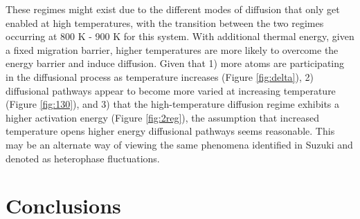 \documentclass{elsarticle}
\begin{document}
These regimes might exist due to the different modes of diffusion that only get enabled at high temperatures, with the transition between the two regimes occurring at 800 K - 900 K for this system. With additional thermal energy, given a fixed migration barrier, higher temperatures are more likely to overcome the energy barrier and induce diffusion. Given that 1) more atoms are participating in the diffusional process as temperature increases (Figure \ref{fig:delta}), 2) diffusional pathways appear to become more varied at increasing temperature (Figure \ref{fig:130}), and 3) that the high-temperature diffusion regime exhibits a higher activation energy (Figure \ref{fig:2reg}), the assumption that increased temperature opens higher energy diffusional pathways seems reasonable. This may be an alternate way of viewing the same phenomena identified in Suzuki \cite{suzuki2005} and denoted as heterophase fluctuations. 


\FloatBarrier
\section{Conclusions}
\end{document}
